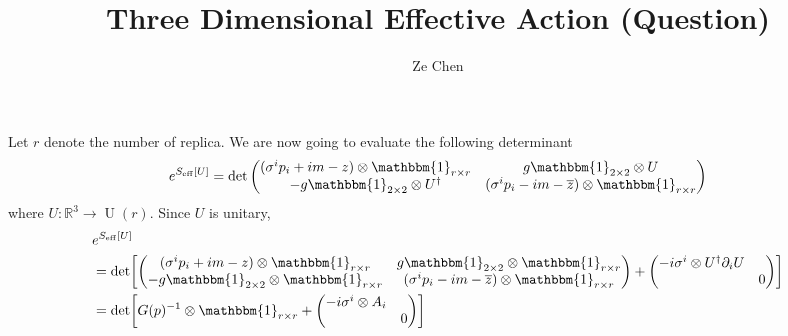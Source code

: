 \documentclass{article}
\title{Three Dimensional Effective Action (Question)}
\author{Ze Chen}
\begin{document}
\maketitle

Let $r$ denote the number of replica.
We are now going to evaluate the following determinant
\[ e^{S_{\mathrm{eff}}[U]} = \det\begin{pmatrix}
    (\sigma^i p_i + im - z) \otimes \mathbbm{1}_{r\times r} & g\mathbbm{1}_{2\times 2} \otimes U \\
    -g\mathbbm{1}_{2\times 2} \otimes U^\dagger & (\sigma^i p_i - im - \overline{z}) \otimes \mathbbm{1}_{r\times r}
\end{pmatrix} \]
where $U: \mathbb{R}^3 \rightarrow \operatorname{U}(r)$.
Since $U$ is unitary,
\begin{align*}
    &e^{S_{\mathrm{eff}}[U]} \\ %
    &= \det[\begin{pmatrix}
        (\sigma^i p_i + im - z) \otimes \mathbbm{1}_{r\times r} & g\mathbbm{1}_{2\times 2} \otimes \mathbbm{1}_{r\times r} \\
        -g\mathbbm{1}_{2\times 2} \otimes \mathbbm{1}_{r\times r} & (\sigma^i p_i - im - \overline{z}) \otimes \mathbbm{1}_{r\times r}
    \end{pmatrix} + \begin{pmatrix}
        -i \sigma^i \otimes U^\dagger \partial_i U& \\
        & 0
    \end{pmatrix}] \\
    &= \det[G(p)^{-1} \otimes \mathbbm{1}_{r\times r} + \begin{pmatrix}
        -i \sigma^i \otimes A_i& \\
        & 0
    \end{pmatrix}]
\end{align*}
\end{document}
